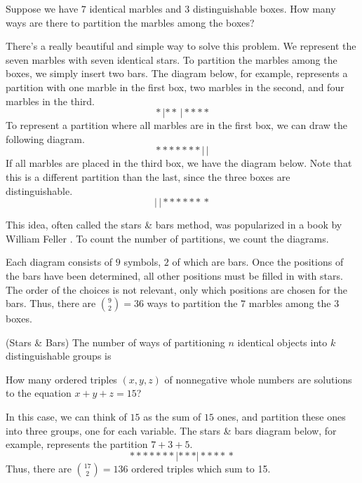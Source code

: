 Suppose we have $7$ identical marbles and $3$ distinguishable boxes. How many ways are there to partition the marbles among the boxes?
\par
There's a really beautiful and simple way to solve this problem. We represent the seven marbles with seven identical stars. To partition the marbles among the boxes, we simply insert two bars. The diagram below, for example, represents a partition with one marble in the first box, two marbles in the second, and four marbles in the third.
$$*\,|**\,|****$$
To represent a partition where all marbles are in the first box, we can draw the following diagram.
$$*******\,|\,|$$
If all marbles are placed in the third box, we have the diagram below. Note that this is a different partition than the last, since the three boxes are distinguishable.
$$|\,|******\,*$$
\par
This idea, often called the stars \& bars  method, was popularized in a book by William Feller \cite{Feller}. To count the number of partitions, we count the diagrams.
\par
Each diagram consists of $9$ symbols, $2$ of which are bars. Once the positions of the bars have been determined, all other positions must be filled in with stars. The order of the choices is not relevant, only which positions are chosen for the bars. Thus, there are $\binom{9}{2} = 36$ ways to partition the $7$ marbles among the $3$ boxes.

\begin{prop}\label{StarsAndBars} (Stars \& Bars) The number of ways of partitioning $n$ identical objects into $k$ distinguishable groups is 
\end{prop}

\begin{examp} How many ordered triples $(x,y,z)$ of nonnegative whole numbers are solutions to the equation $x+y+z=15$?
\par
\noindent In this case, we can think of $15$ as the sum of $15$ ones, and partition these ones into three groups, one for each variable. The stars \& bars diagram below, for example, represents the partition $7+3+5$.
$$*******\,|***|****\,*$$
Thus, there are $\binom{17}{2} = 136$ ordered triples which sum to 15.
\end{examp}

